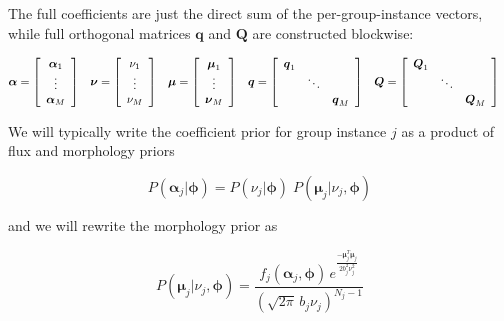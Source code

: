 \documentclass{amsart}
\newcommand{\bm}[1]{\ensuremath{\boldsymbol{#1}}}
\begin{document}
The full coefficients are just the direct sum of the
per-group-instance vectors, while full orthogonal matrices $\bm{q}$
and $\bm{Q}$ are constructed blockwise:

\begin{align*}
  \bm{\alpha} &=
  \left[\begin{array}{ c }
      \bm{\alpha}_1 \\
      \vdots \\
      \bm{\alpha}_M
    \end{array}\right] &
  \bm{\nu} &=
  \left[\begin{array}{ c }
      \nu_1 \\
      \vdots \\
      \nu_M
    \end{array}\right] &
  \bm{\mu} &=
  \left[\begin{array}{ c }
      \bm{\mu}_1 \\
      \vdots \\
      \bm{\nu}_M
    \end{array}\right] &
  \bm{q} &=  
  \left[\begin{array}{ c c c }
      \bm{q}_1 &        & \\
                   & \ddots & \\
                   &        & \bm{q}_M
    \end{array}\right] &
  \bm{Q} &=
  \left[\begin{array}{ c c c }
      \bm{Q}_1 &        & \\
                   & \ddots & \\
                   &        & \bm{Q}_M
    \end{array}\right]
\end{align*}

We will typically write the coefficient prior for group instance $j$
as a product of flux and morphology priors

\begin{equation}
  P(\bm{\alpha}_j|\bm{\phi}) = P(\nu_j|\bm{\phi})
  \;P(\bm{\mu}_j|\nu_j,\bm{\phi})
\end{equation}

and we will rewrite the morphology prior as

\begin{equation}
  P(\bm{\mu}_j|\nu_j,\bm{\phi}) = 
  \frac{f_j(\bm{\alpha}_j,\bm{\phi})\,e^{\frac{-\bm{\mu}_j^T\!\bm{\mu}_j}{2b_j^2\nu_j^2}}}
  {\left(\sqrt{2\pi}\,b_j \nu_j\right)^{{N_j-1}}}
\end{equation}
\end{document}

